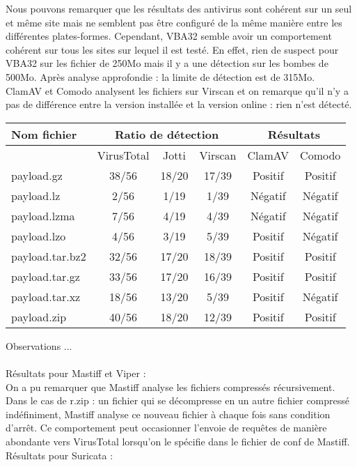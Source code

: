 \documentclass[smallextended]{svjour3}       %
\begin{document}
$ $\\
Nous pouvons remarquer que les résultats des antivirus sont cohérent sur un seul et même site mais ne semblent pas être configuré de la même manière entre les différentes plates-formes. Cependant, VBA32 semble avoir un comportement cohérent sur tous les sites sur lequel il est testé. En effet, rien de suspect pour VBA32 sur les fichier de 250Mo mais il y a une détection sur les bombes de 500Mo. Après analyse approfondie : la limite de détection est de 315Mo.\\
ClamAV et Comodo analysent les fichiers sur Virscan et on remarque qu'il n'y a pas de différence entre la version installée et la version online : rien n'est détecté.\\
$ $\\
\begin{tabular}{|l|c|c|c|c|c|}
    \hline
     \textbf{Nom fichier}  & \multicolumn{3}{|c|}{\textbf{Ratio de détection}} & \multicolumn{2}{|c|}{\textbf{Résultats}} \\
    \hline
     & VirusTotal & Jotti & Virscan & ClamAV & Comodo\\
    \hline
    payload.gz & 38/56 & 18/20 & 17/39 & Positif & Positif \\
    \hline
    payload.lz & 2/56 & 1/19 & 1/39 & Négatif & Négatif\\
    \hline
    payload.lzma & 7/56 & 4/19 & 4/39 & Négatif & Négatif\\
    \hline
    payload.lzo & 4/56 & 3/19 & 5/39 & Positif & Négatif \\
    \hline
    payload.tar.bz2 & 32/56 & 17/20 & 18/39 & Positif & Positif \\
    \hline
    payload.tar.gz & 33/56 & 17/20 & 16/39 & Positif & Positif\\
    \hline
    payload.tar.xz & 18/56 & 13/20 & 5/39 & Positif & Négatif \\
    \hline
    payload.zip & 40/56 & 18/20 & 12/39 & Positif & Positif\\
    \hline
\end{tabular}
$ $\\Observations ...
$ $\\
\\
Résultats pour Mastiff et Viper :\\
On a pu remarquer que Mastiff analyse les fichiers compressés récursivement. Dans le cas de r.zip : un fichier qui se décompresse en un autre fichier compressé indéfiniment, Mastiff analyse ce nouveau fichier à chaque fois sans condition d’arrêt. Ce comportement peut occasionner l'envoie de requêtes de manière abondante vers VirusTotal lorsqu'on le spécifie dans le fichier de conf de Mastiff.\\
$ $\\
Résultats pour Suricata :\\
\end{document}
